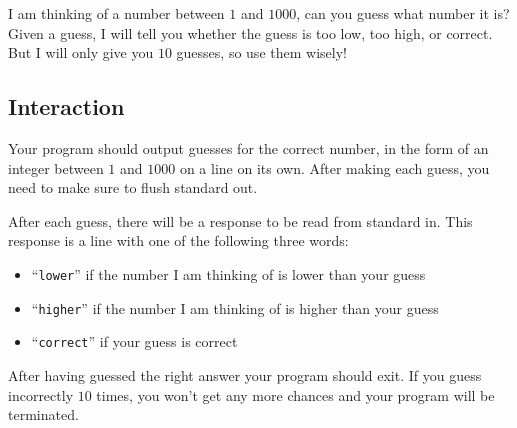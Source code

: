 
I am thinking of a number between $1$ and $1000$, can you guess what
number it is?  Given a guess, I will tell you whether the guess is too
low, too high, or correct.  But I will only give you $10$ guesses, so
use them wisely!

\subsection*{Interaction}

Your program should output guesses for the correct number, in the form
of an integer between $1$ and $1000$ on a line on its own.  After
making each guess, you need to make sure to flush standard out.

After each guess, there will be a response to be read from standard
in.  This response is a line with one of the following three words:
\begin{itemize}
\item ``\texttt{lower}'' if the number I am thinking of is lower than your guess
\item ``\texttt{higher}'' if the number I am thinking of is higher than your guess
\item ``\texttt{correct}'' if your guess is correct
\end{itemize}
After having guessed the right answer your program should exit.  If
you guess incorrectly $10$ times, you won't get any more chances and
your program will be terminated.
